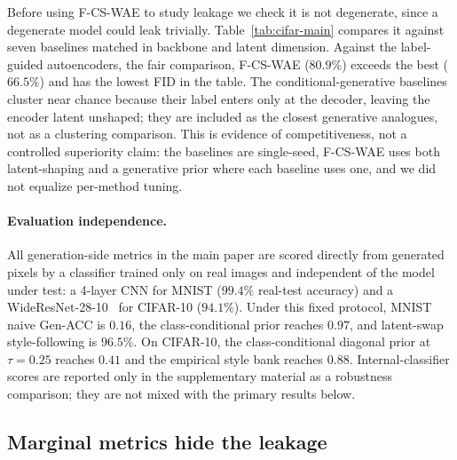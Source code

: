 \documentclass[letterpaper]{article}
\newcommand{\ours}{F-CS-WAE}
\begin{document}
Before using \ours{} to study leakage we check it is not degenerate, since a
degenerate model could leak trivially. Table~\ref{tab:cifar-main} compares it
against seven baselines matched in backbone and latent dimension. Against the
label-guided autoencoders, the fair comparison, \ours{} ($80.9\%$) exceeds the
best ($66.5\%$) and has the lowest FID in the table. The
conditional-generative baselines cluster near chance because their label
enters only at the decoder, leaving the encoder latent unshaped; they are
included as the closest generative analogues, not as a clustering
comparison. This is evidence of competitiveness, not a controlled
superiority claim: the baselines are single-seed, \ours{} uses both
latent-shaping and a generative prior where each baseline uses one, and we
did not equalize per-method tuning.

\paragraph{Evaluation independence.}
All generation-side metrics in the main paper are scored directly from
generated pixels by a classifier trained only on real images and independent
of the model under test: a 4-layer CNN for MNIST ($99.4\%$ real-test
accuracy) and a WideResNet-28-10~\citep{zagoruyko2016wide} for CIFAR-10
($94.1\%$). Under this fixed
protocol, MNIST naive Gen-ACC is $0.16$, the class-conditional prior reaches
$0.97$, and latent-swap style-following is $96.5\%$. On CIFAR-10, the
class-conditional diagonal prior at $\tau{=}0.25$ reaches $0.41$ and the
empirical style bank reaches $0.88$. Internal-classifier scores are reported
only in the supplementary material as a robustness comparison; they are not
mixed with the primary results below.

\subsection{Marginal metrics hide the leakage}
\label{sec:exp-hide}
\end{document}
